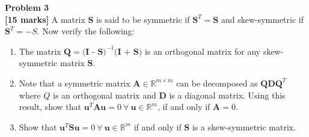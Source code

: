 \documentclass[fleqn]{article}
\newenvironment{problem}[2][Problem]
    { \begin{mdframed}[backgroundcolor=gray!20] \textbf{#1 #2} \\}
    {  \end{mdframed}}
\begin{document}
\newpage
\begin{problem}{3}
\textbf{[15 marks]} A matrix $\textbf{S}$ is said to be symmetric if $\textbf{S}^T = \textbf{S}$ and skew-symmetric if $\textbf{S}^T = -S$. Now verify the following:
\begin{enumerate}[label=(\alph*)]
    \item The matrix $\textbf{Q} = \textbf{(I - S)}^{-1}\textbf{(I + S)}$ is an orthogonal matrix for any skew-symmetric matrix $\textbf{S}$.
    \item Note that a symmetric matrix $\textbf{A} \in \mathbb{R}^{m \times m}$ can be decomposed as $\textbf{QDQ}^T$ where $Q$ is an orthogonal matrix and $\textbf{D}$ is a diagonal matrix. Using this result, show that $\textbf{u}^T\textbf{Au} = 0 ~\forall~ \textbf{u} \in \mathbb{R}^{m}$, if and only if $\textbf{A} = 0$.
    \item Show that $\textbf{u}^T\textbf{Su} = 0 ~\forall~ \textbf{u} \in \mathbb{R}^{m}$ if and only if $\textbf{S}$ is a skew-symmetric matrix.  
\end{enumerate}
\end{problem}
\end{document}
